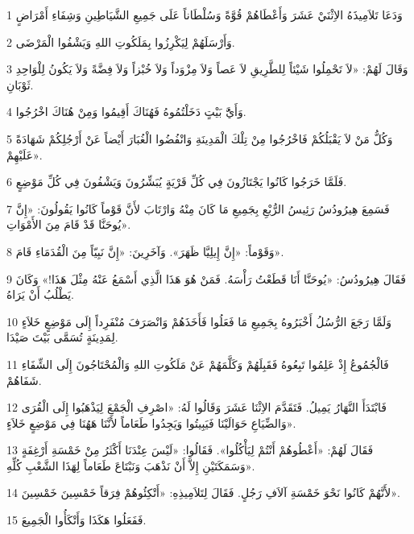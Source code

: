 \par 1 وَدَعَا تَلاَمِيذَهُ الاِثْنَيْ عَشَرَ وَأَعْطَاهُمْ قُوَّةً وَسُلْطَاناً عَلَى جَمِيعِ الشَّيَاطِينِ وَشِفَاءِ أَمْرَاضٍ
\par 2 وَأَرْسَلَهُمْ لِيَكْرِزُوا بِمَلَكُوتِ اللهِ وَيَشْفُوا الْمَرْضَى.
\par 3 وَقَالَ لَهُمْ: «لاَ تَحْمِلُوا شَيْئاً لِلطَّرِيقِ لاَ عَصاً وَلاَ مِزْوَداً وَلاَ خُبْزاً وَلاَ فِضَّةً وَلاَ يَكُونُ لِلْوَاحِدِ ثَوْبَانِ.
\par 4 وَأَيَُّ بَيْتٍ دَخَلْتُمُوهُ فَهُنَاكَ أَقِيمُوا وَمِنْ هُنَاكَ اخْرُجُوا.
\par 5 وَكُلُّ مَنْ لاَ يَقْبَلُكُمْ فَاخْرُجُوا مِنْ تِلْكَ الْمَدِينَةِ وَانْفُضُوا الْغُبَارَ أَيْضاً عَنْ أَرْجُلِكُمْ شَهَادَةً عَلَيْهِمْ».
\par 6 فَلَمَّا خَرَجُوا كَانُوا يَجْتَازُونَ فِي كُلِّ قَرْيَةٍ يُبَشِّرُونَ وَيَشْفُونَ فِي كُلِّ مَوْضِعٍ.
\par 7 فَسَمِعَ هِيرُودُسُ رَئِيسُ الرُّبْعِ بِجَمِيعِ مَا كَانَ مِنْهُ وَارْتَابَ لأَنَّ قَوْماً كَانُوا يَقُولُونَ: «إِنَّ يُوحَنَّا قَدْ قَامَ مِنَ الأَمْوَاتِ».
\par 8 وَقَوْماً: «إِنَّ إِيلِيَّا ظَهَرَ». وَآخَرِينَ: «إِنَّ نَبِيّاً مِنَ الْقُدَمَاءِ قَامَ».
\par 9 فَقَالَ هِيرُودُسُ: «يُوحَنَّا أَنَا قَطَعْتُ رَأْسَهُ. فَمَنْ هُوَ هَذَا الَّذِي أَسْمَعُ عَنْهُ مِثْلَ هَذَا!» وَكَانَ يَطْلُبُ أَنْ يَرَاهُ.
\par 10 وَلَمَّا رَجَعَ الرُّسُلُ أَخْبَرُوهُ بِجَمِيعِ مَا فَعَلُوا فَأَخَذَهُمْ وَانْصَرَفَ مُنْفَرِداً إِلَى مَوْضِعٍ خَلاَءٍ لِمَدِينَةٍ تُسَمَّى بَيْتَ صَيْدَا.
\par 11 فَالْجُمُوعُ إِذْ عَلِمُوا تَبِعُوهُ فَقَبِلَهُمْ وَكَلَّمَهُمْ عَنْ مَلَكُوتِ اللهِ وَالْمُحْتَاجُونَ إِلَى الشِّفَاءِ شَفَاهُمْ.
\par 12 فَابْتَدَأَ النَّهَارُ يَمِيلُ. فَتَقَدَّمَ الاِثْنَا عَشَرَ وَقَالُوا لَهُ: «اصْرِفِ الْجَمْعَ لِيَذْهَبُوا إِلَى الْقُرَى وَالضِّيَاعِ حَوَالَيْنَا فَيَبِيتُوا وَيَجِدُوا طَعَاماً لأَنَّنَا هَهُنَا فِي مَوْضِعٍ خَلاَءٍ».
\par 13 فَقَالَ لَهُمْ: «أَعْطُوهُمْ أَنْتُمْ لِيَأْكُلُوا». فَقَالُوا: «لَيْسَ عِنْدَنَا أَكْثَرُ مِنْ خَمْسَةِ أَرْغِفَةٍ وَسَمَكَتَيْنِ إِلاَّ أَنْ نَذْهَبَ وَنَبْتَاعَ طَعَاماً لِهَذَا الشَّعْبِ كُلِّهِ».
\par 14 لأَنَّهُمْ كَانُوا نَحْوَ خَمْسَةِ آلاَفِ رَجُلٍ. فَقَالَ لِتَلاَمِيذِهِ: «أَتْكِئُوهُمْ فِرَقاً خَمْسِينَ خَمْسِينَ».
\par 15 فَفَعَلُوا هَكَذَا وَأَتْكَأُوا الْجَمِيعَ.
